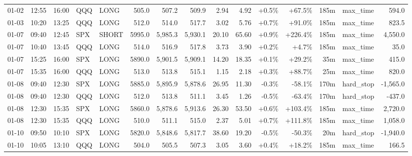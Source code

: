 \documentclass[11pt,a4paper,twoside]{article}
\begin{document}
\begin{landscape}
\begin{center}
\begin{longtable}{>{\color{txtmain}}l l l l l r r r r r r r r >{\color{txtmain}}l r}
01-02 & 12:55 & 16:00 & QQQ & LONG & 505.0 & 507.2 & 509.9 & 2.94 & 4.92 & \textcolor{wingreen}{+0.5\%} & \textcolor{wingreen}{+67.5\%} & 185m & max\_time & \textcolor{wingreen}{594.0} \\
01-03 & 10:20 & 13:25 & QQQ & LONG & 512.0 & 514.0 & 517.7 & 3.02 & 5.76 & \textcolor{wingreen}{+0.7\%} & \textcolor{wingreen}{+91.0\%} & 185m & max\_time & \textcolor{wingreen}{823.5} \\
01-07 & 09:40 & 12:45 & SPX & SHORT & 5995.0 & 5,985.3 & 5,930.1 & 20.10 & 65.60 & \textcolor{wingreen}{+0.9\%} & \textcolor{wingreen}{+226.4\%} & 185m & max\_time & \textcolor{wingreen}{4,550.0} \\
01-07 & 10:40 & 13:45 & QQQ & LONG & 514.0 & 516.9 & 517.8 & 3.73 & 3.90 & \textcolor{wingreen}{+0.2\%} & \textcolor{wingreen}{+4.7\%} & 185m & max\_time & \textcolor{wingreen}{35.0} \\
01-07 & 15:25 & 16:00 & SPX & LONG & 5890.0 & 5,901.5 & 5,909.1 & 14.20 & 18.35 & \textcolor{wingreen}{+0.1\%} & \textcolor{wingreen}{+29.2\%} & 35m & max\_time & \textcolor{wingreen}{415.0} \\
01-07 & 15:35 & 16:00 & QQQ & LONG & 513.0 & 513.8 & 515.1 & 1.15 & 2.18 & \textcolor{wingreen}{+0.3\%} & \textcolor{wingreen}{+88.7\%} & 25m & max\_time & \textcolor{wingreen}{820.0} \\
01-08 & 09:40 & 12:30 & SPX & LONG & 5885.0 & 5,895.9 & 5,878.6 & 26.95 & 11.30 & \textcolor{lossred}{-0.3\%} & \textcolor{lossred}{-58.1\%} & 170m & hard\_stop & \textcolor{lossred}{-1,565.0} \\
01-08 & 09:40 & 12:30 & QQQ & LONG & 512.0 & 513.8 & 511.1 & 3.45 & 1.26 & \textcolor{lossred}{-0.5\%} & \textcolor{lossred}{-63.4\%} & 170m & hard\_stop & \textcolor{lossred}{-437.0} \\
01-08 & 12:30 & 15:35 & SPX & LONG & 5860.0 & 5,878.6 & 5,913.6 & 26.30 & 53.50 & \textcolor{wingreen}{+0.6\%} & \textcolor{wingreen}{+103.4\%} & 185m & max\_time & \textcolor{wingreen}{2,720.0} \\
01-08 & 12:30 & 15:35 & QQQ & LONG & 510.0 & 511.1 & 515.0 & 2.37 & 5.01 & \textcolor{wingreen}{+0.7\%} & \textcolor{wingreen}{+111.8\%} & 185m & max\_time & \textcolor{wingreen}{1,058.0} \\
01-10 & 09:50 & 10:10 & SPX & LONG & 5820.0 & 5,848.6 & 5,817.7 & 38.60 & 19.20 & \textcolor{lossred}{-0.5\%} & \textcolor{lossred}{-50.3\%} & 20m & hard\_stop & \textcolor{lossred}{-1,940.0} \\
01-10 & 10:05 & 13:10 & QQQ & LONG & 504.0 & 505.5 & 507.3 & 3.05 & 3.60 & \textcolor{wingreen}{+0.4\%} & \textcolor{wingreen}{+18.2\%} & 185m & max\_time & \textcolor{wingreen}{166.5} \\

\end{longtable}
\end{center}
\end{landscape}
\end{document}
